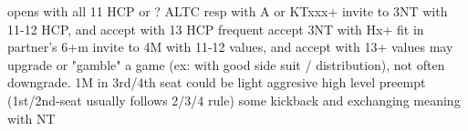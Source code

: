 opens with all 11 HCP or ? ALTC
    resp with A or KTxxx+
invite to 3NT with 11-12 HCP, and accept with 13 HCP
frequent accept 3NT with Hx+ fit in partner's 6+m
invite to 4M with 11-12 values, and accept with 13+ values
may upgrade or "gamble" a game (ex: with good side suit / distribution), not often downgrade.
1M in 3rd/4th seat could be light
aggresive high level preempt (1st/2nd-seat usually follows 2/3/4 rule)
some kickback and exchanging meaning with NT